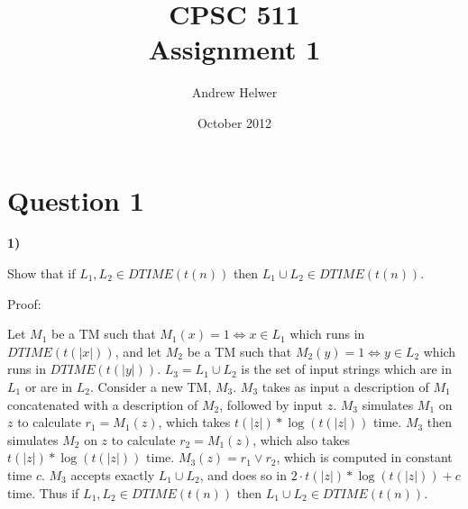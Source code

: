 \documentclass{article}
\begin{document}
\title{CPSC 511 \\ Assignment 1}
\author{Andrew Helwer}
\date{October 2012}
\maketitle

\section{Question 1}

\textbf{1)}

Show that if $L_1, L_2 \in DTIME(t(n))$ then $L_1 \cup L_2 \in DTIME(t(n))$.

Proof:

Let $M_1$ be a TM such that $M_1(x) = 1 \Leftrightarrow x \in L_1$ which runs in $DTIME(t(|x|))$, and let $M_2$ be a TM such that $M_2(y) = 1 \Leftrightarrow y \in L_2$ which runs in $DTIME(t(|y|))$. 
$L_3 = L_1 \cup L_2$ is the set of input strings which are in $L_1$ or are in $L_2$.
Consider a new TM, $M_3$.
$M_3$ takes as input a description of $M_1$ concatenated with a description of $M_2$, followed by input $z$.
$M_3$ simulates $M_1$ on $z$ to calculate $r_1 = M_1(z)$, which takes $t(|z|)*\log(t(|z|))$ time.
$M_3$ then simulates $M_2$ on $z$ to calculate $r_2 = M_1(z)$, which also takes $t(|z|)*\log(t(|z|))$ time.
$M_3(z) = r_1 \vee r_2$, which is computed in constant time $c$.
$M_3$ accepts exactly $L_1 \cup L_2$, and does so in $2 \cdot t(|z|)*\log(t(|z|)) + c$ time.
Thus if $L_1, L_2 \in DTIME(t(n))$ then $L_1 \cup L_2 \in DTIME(t(n))$.
\end{document}
